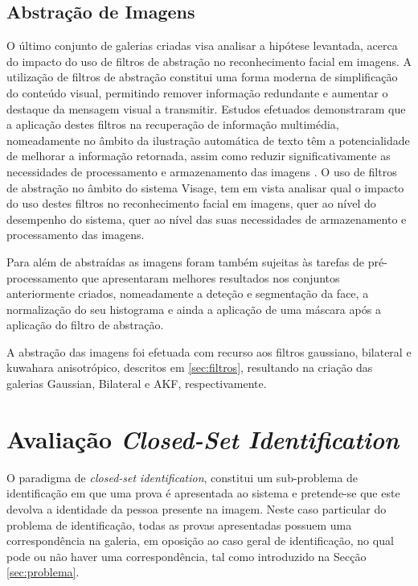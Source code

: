 \subsection{Abstração de Imagens} \label{sec:pre-abstração}
O último conjunto de galerias criadas visa analisar a hipótese levantada, acerca do impacto do uso de filtros de abstração no reconhecimento facial em imagens. 
A utilização de filtros de abstração constitui uma forma moderna de simplificação do conteúdo visual, permitindo remover informação redundante e aumentar o destaque da mensagem visual a transmitir. Estudos efetuados demonstraram que a aplicação destes filtros na recuperação de informação multimédia, nomeadamente no âmbito da ilustração automática de texto têm a potencialidade de melhorar a informação retornada, assim como reduzir significativamente as necessidades de processamento e armazenamento das imagens \cite{Coelho:2012:IAC:2260641.2260676}. O uso de filtros de abstração no âmbito do sistema Visage, tem em vista analisar qual o impacto do uso destes filtros no reconhecimento facial em imagens, quer ao nível do desempenho do sistema, quer ao nível das suas necessidades de armazenamento e processamento das imagens.

Para além de abstraídas as imagens foram também sujeitas às tarefas de pré-processamento que apresentaram melhores resultados nos conjuntos anteriormente criados, nomeadamente a deteção e segmentação da face, a normalização do seu histograma e ainda a aplicação de uma máscara após a aplicação do filtro de abstração.

A abstração das imagens foi efetuada com recurso aos filtros gaussiano, bilateral e kuwahara anisotrópico, descritos em \ref{sec:filtros}, resultando na criação das galerias Gaussian, Bilateral e AKF, respectivamente.

\section{Avaliação \textit{Closed-Set Identification}} \label{sec:avaliacao1}
O paradigma de \textit{closed-set identification}, constitui um sub-problema de identificação em que uma prova é apresentada ao sistema e pretende-se que este devolva a identidade da pessoa presente na imagem. Neste caso particular do problema de identificação, todas as provas apresentadas possuem uma correspondência na galeria, em oposição ao caso geral de identificação, no qual pode ou não haver uma correspondência, tal como introduzido na Secção \ref{sec:problema}.


